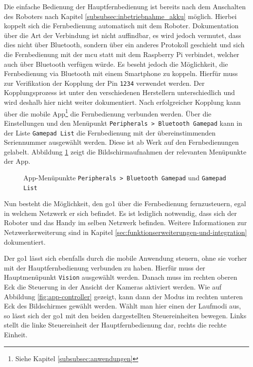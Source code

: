 Die einfache Bedienung der Hauptfernbedienung ist bereits nach dem Anschalten des Roboters nach Kapitel \ref{subsubsec:inbetriebnahme_akku} möglich.
Hierbei koppelt sich die Fernbedienung automatisch mit dem Roboter.
Dokumentation über die Art der Verbindung ist nicht auffindbar, es wird jedoch vermutet, dass dies nicht über Bluetooth,
sondern über ein anderes Protokoll geschieht und sich die Fernbedienung mit der \gls{mcu} statt mit dem Raspberry
Pi verbindet, welcher auch über Bluetooth verfügen würde.
Es beseht jedoch die Möglichkeit, die Fernbedienung via Bluetooth mit einem Smartphone zu koppeln.
Hierfür muss zur Verifikation der Kopplung der Pin \texttt{1234} verwendet werden.
Der Kopplungsprozess ist unter den verschiedenen Herstellern unterschiedlich und wird deshalb hier nicht weiter dokumentiert.
Nach erfolgreicher Kopplung kann über die mobile App\footnote{Siehe Kapitel \ref{subsubsec:anwendungen}} die Fernbedienung verbunden werden.
Über die Einstellungen und den Menüpunkt \texttt{Peripherals > Bluetooth Gamepad} kann in der Liste \texttt{Gamepad List}
die Fernbedienung mit der übereinstimmenden Seriennummer ausgewählt werden.
Diese ist ab Werk auf den Fernbedienungen gelabelt.
Abbildung \ref{fig:controller-app} zeigt die Bildschirmaufnahmen der relevanten Menüpunkte der App.

\begin{figure}[h]
    \caption{App-Menüpunkte \texttt{Peripherals > Bluetooth Gamepad} und \texttt{Gamepad List}}\label{fig:controller-app}
\end{figure}

\noindent Nun besteht die Möglichkeit, den \gls{go1} über die Fernbedienung fernzusteuern, egal in welchem Netzwerk er sich befindet.
Es ist lediglich notwendig, dass sich der Roboter und das Handy im selben Netzwerk befinden.
Weitere Informationen zur Netzwerkerweiterung sind in Kapitel \ref{sec:funktionserweiterungen-und-integration} dokumentiert.


Der \gls{go1} lässt sich ebenfalls durch die mobile Anwendung steuern, ohne sie vorher mit der Hauptfernbedienung verbunden zu haben.
Hierfür muss der Hauptmenüpunkt \texttt{Vision} ausgewählt werden.
Danach muss im rechten oberen Eck die Steuerung in der Ansicht der Kameras aktiviert werden.
Wie auf Abbildung \ref{fig:app-controller} gezeigt, kann dann der Modus im rechten unteren Eck des Bildschirmes gewählt werden.
Wählt man hier einen der Laufmodi aus, so lässt sich der \gls{go1} mit den beiden dargestellten Steuereinheiten bewegen.
Links stellt die linke Steuereinheit der Hauptfernbedienung dar, rechts die rechte Einheit.

